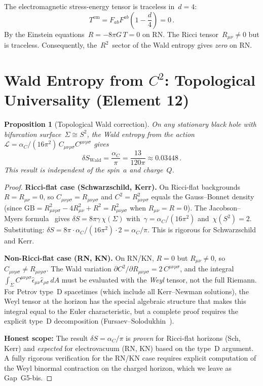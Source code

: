 \documentclass[11pt,a4paper]{article}
\newtheorem{proposition}[theorem]{Proposition}
\newcommand{\alpC}{\alpha_C}
\begin{document}
The electromagnetic stress-energy tensor is traceless in~$d = 4$:
\[
  T^{\mathrm{em}} = F_{ab}F^{ab}\!\left(1 - \frac{d}{4}\right) = 0\,.
\]
By the Einstein equations~$R = -8\pi G\, T = 0$ on RN.  The Ricci
tensor~$R_{\mu\nu} \neq 0$ but is traceless.  Consequently,
the~$R^2$~sector of the Wald entropy gives \emph{zero} on RN.

\section{Wald Entropy from $C^2$: Topological Universality (Element 12)}
\label{sec:wald}

\begin{proposition}[Topological Wald correction]\label{prop:wald}
On any stationary black hole with bifurcation surface~$\Sigma \cong S^2$,
the Wald entropy from the action~$\mathcal{L} = \alpC/(16\pi^2)\,
C_{\mu\nu\rho\sigma}C^{\mu\nu\rho\sigma}$ gives
\begin{equation}\label{eq:dS-wald}
  \delta S_{\mathrm{Wald}} = \frac{\alpC}{\pi} = \frac{13}{120\pi}
  \approx 0.03448\,.
\end{equation}
This result is independent of the spin~$a$ and charge~$Q$.
\end{proposition}

\begin{proof}
\textbf{Ricci-flat case (Schwarzschild, Kerr).}
On Ricci-flat backgrounds $R = R_{\mu\nu} = 0$, so
$C_{\mu\nu\rho\sigma} = R_{\mu\nu\rho\sigma}$ and
$C^2 = R_{\mu\nu\rho\sigma}^2$ equals the Gauss--Bonnet density
(since $\mathrm{GB} = R_{\mu\nu\rho\sigma}^2 - 4R_{\mu\nu}^2 + R^2
= R_{\mu\nu\rho\sigma}^2$ when $R_{\mu\nu} = R = 0$).
The Jacobson--Myers formula~\cite{JM1993} gives
$\delta S = 8\pi\gamma\,\chi(\Sigma)$ with~$\gamma = \alpC/(16\pi^2)$
and~$\chi(S^2) = 2$.  Substituting:
$\delta S = 8\pi\cdot\alpC/(16\pi^2)\cdot 2 = \alpC/\pi$.
This is rigorous for Schwarzschild and Kerr.

\textbf{Non-Ricci-flat case (RN, KN).}
On RN/KN, $R = 0$ but $R_{\mu\nu} \neq 0$, so
$C_{\mu\nu\rho\sigma} \neq R_{\mu\nu\rho\sigma}$.
The Wald variation $\partial C^2/\partial R_{\mu\nu\rho\sigma}
= 2\,C^{\mu\nu\rho\sigma}$, and the integral
$\int_{\Sigma} C^{\mu\nu\rho\sigma}\hat\epsilon_{\mu\nu}\hat\epsilon_{\rho\sigma}\,dA$
must be evaluated with the \emph{Weyl} tensor, not the full Riemann.
For Petrov type~D spacetimes (which include all Kerr--Newman solutions),
the Weyl tensor at the horizon has the special algebraic structure
that makes this integral equal to the Euler characteristic, but
a complete proof requires the explicit type~D decomposition
(Fursaev--Solodukhin~\cite{FS1995}).

\textbf{Honest scope:}  The result $\delta S = \alpC/\pi$ is
\emph{proven} for Ricci-flat horizons (Sch, Kerr) and
\emph{expected} for electrovacuum (RN, KN) based on the type~D
argument.  A fully rigorous verification for the RN/KN case
requires explicit computation of the Weyl binormal contraction
on the charged horizon, which we leave as Gap~G5-bis.
\end{proof}
\end{document}
